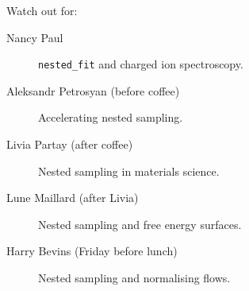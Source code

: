 \documentclass[aspectratio=169]{beamer}
\begin{document}
\begin{frame}
\begin{block}{Watch out for:}
\begin{description}
            \item[Nancy Paul] \texttt{nested\_fit} and charged ion spectroscopy.
            \item[Aleksandr Petrosyan (before coffee)] Accelerating nested sampling.
            \item[Livia Partay (after coffee)] Nested sampling in materials science.
            \item[Lune Maillard (after Livia)] Nested sampling and free energy surfaces.
            \item[Harry Bevins (Friday before lunch)] Nested sampling and normalising flows.
        \end{description}
    \end{block}
\end{frame}

\appendix
\end{document}
